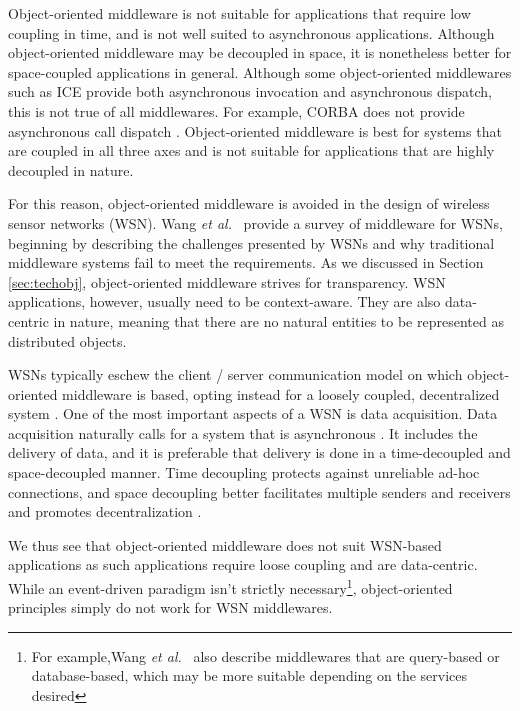 \documentclass{acm_proc_article-sp}
\def\etal{{\it et al.\/}}
\begin{document}

Object-oriented middleware is not suitable for applications that require low coupling in time, and is not well suited to asynchronous applications.  Although object-oriented middleware may be decoupled in space, it is nonetheless better for space-coupled applications in general.  Although some object-oriented middlewares such as ICE provide both asynchronous invocation and asynchronous dispatch, this is not true of all middlewares.  For example, CORBA does not provide asynchronous call dispatch \cite{Henning:2004p8372}.  Object-oriented middleware is best for systems that are coupled in all three axes and is not suitable for applications that are highly decoupled in nature.

For this reason, object-oriented middleware is avoided in the design of wireless sensor networks (WSN). Wang \etal\ \cite{Wang:2008p8370} provide a survey of middleware for WSNs, beginning by describing the challenges presented by WSNs and why traditional middleware systems fail to meet the requirements.  As we discussed in Section \ref{sec:techobj}, object-oriented middleware strives for transparency.  WSN applications, however, usually need to be context-aware.  They are also data-centric in nature, meaning that there are no natural entities to be represented as distributed objects.


WSNs typically eschew the client / server communication model on which object-oriented middleware is based, opting instead for a loosely coupled, decentralized system \cite{Meier:2002p8380}.  One of the most important aspects of a WSN is data acquisition.  Data acquisition naturally calls for a system that is asynchronous \cite{Wang:2008p8370}.  It includes the delivery of data, and it is preferable that delivery is done in a time-decoupled and space-decoupled manner. Time decoupling protects against unreliable ad-hoc connections, and space decoupling better facilitates multiple senders and receivers and promotes decentralization \cite{Meier:2002p8380}.

We thus see that object-oriented middleware does not suit WSN-based applications as such applications require loose coupling and are data-centric.  While an event-driven paradigm isn't strictly necessary\footnote{For example,Wang \etal\ \cite{Wang:2008p8370} also describe middlewares that are query-based or database-based, which may be more suitable depending on the services desired}, object-oriented principles simply do not work for WSN middlewares.
\end{document}
